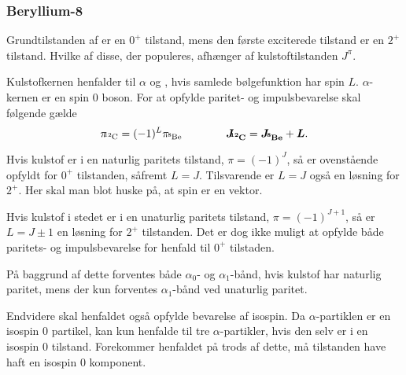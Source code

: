 \subsubsection{Beryllium-8}
\label{sec:pop-beryllium}

Grundtilstanden af \Be er en $0^{+}$ tilstand, mens den første exciterede tilstand er en $2^{+}$
tilstand. Hvilke af disse, der populeres, afhænger af kulstoftilstanden $J^{\pi}$.

Kulstofkernen henfalder til $\alpha$ og \Be, hvis samlede bølgefunktion har spin $L$.  $\alpha$-kernen er en
spin 0 boson. For at opfylde paritet- og impulsbevarelse skal følgende gælde
\begin{equation}
  \label{eq:spin}
  \pi_{\!\!\Carb} = (-1)^{L} \pi_{\!\Be}  \qquad\qquad \mvec{J_{\!\!\Carb}} = \mvec{J_{\!\Be}} + \mvec{L}.
\end{equation}

Hvis kulstof er i en naturlig paritets tilstand, $\pi = (-1)^{J}$, så er ovenstående opfyldt for
$0^{+}$ tilstanden, såfremt $L = J$. Tilsvarende er $L = J$ også en løsning for $2^{+}$. Her skal
man blot huske på, at spin er en vektor.

Hvis kulstof i stedet er i en unaturlig paritets tilstand, $\pi = (-1)^{J+1}$, så er $L = J\pm1$ en
løsning for $2^{+}$ tilstanden. Det er dog ikke muligt at opfylde både paritets- og impulsbevarelse
for henfald til $0^{+}$ tilstaden.

På baggrund af dette forventes både $\alpha_{0}$- og $\alpha_{1}$-bånd, hvis kulstof har naturlig paritet, mens
der kun forventes $\alpha_{1}$-bånd ved unaturlig paritet.

Endvidere skal henfaldet også opfylde bevarelse af isospin. Da $\alpha$-partiklen er en isospin 0
partikel, kan \Carb kun henfalde til tre $\alpha$-partikler, hvis den selv er i en isospin 0
tilstand. Forekommer henfaldet på trods af dette, må tilstanden have haft en isospin 0 komponent.






